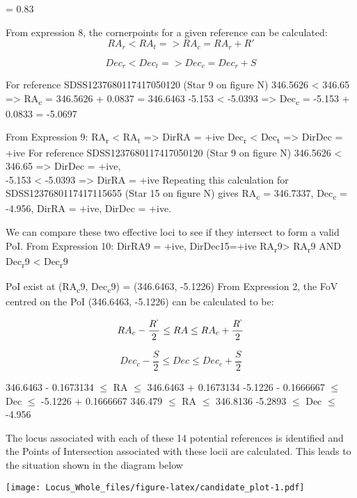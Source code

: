 \documentclass[]{elsarticle} %
\makeatletter
\def\maxwidth{\ifdim\Gin@nat@width>\linewidth\linewidth
\else\Gin@nat@width\fi}
\let\Oldincludegraphics\includegraphics
\renewcommand{\includegraphics}[1]{\Oldincludegraphics[width=\maxwidth]{#1}}
\makeatother
\begin{document}
= 0.83

\newpage

From expression 8, the cornerpoints for a given reference can be
calculated: \[RA_r < RA_t => RA_c = RA_r + R'\]

\[Dec_r < Dec_t => Dec_c = Dec_r + S\]

For reference SDSS1237680117417050120 (Star 9 on figure N) \vskip 0.2in
346.5626 \textless{} 346.65 =\textgreater{} RA\textsubscript{c} =
346.5626 + 0.0837 = 346.6463 \vskip 0.2in -5.153 \textless{} -5.0393
=\textgreater{} Dec\textsubscript{c} = -5.153 + 0.0833 = -5.0697

From Expression 9: RA\textsubscript{r} \textless{} RA\textsubscript{t}
=\textgreater{} DirRA = +ive Dec\textsubscript{r} \textless{}
Dec\textsubscript{t} =\textgreater{} DirDec = +ive \vskip 0.2in For
reference SDSS1237680117417050120 (Star 9 on figure N) \vskip 0.2in
346.5626 \textless{} 346.65 =\textgreater{} DirDec = +ive,\\
-5.153 \textless{} -5.0393 =\textgreater{} DirRA = +ive \vskip 0.2in
Repeating this calculation for SDSS1237680117417115655 (Star 15 on
figure N) gives RA\textsubscript{c} = 346.7337, Dec\textsubscript{c} =
-4.956, \vskip 0.2in DirRA = +ive, DirDec = +ive.

We can compare these two effective loci to see if they intersect to form
a valid PoI. \vskip 0.2in From Expression 10: DirRA9 = +ive,
DirDec15=+ive RA\textsubscript{r}9\textgreater{} RA\textsubscript{r}9
AND Dec\textsubscript{r}9 \textless{} Dec\textsubscript{r}9

PoI exist at (RA\textsubscript{c}9, Dec\textsubscript{c}9) = (346.6463,
-5.1226) \vskip 0.2in From Expression 2, the FoV centred on the PoI
(346.6463, -5.1226) can be calculated to be:

\[RA_c - {\frac{R^`}{2}} \leq RA \leq RA_c + {\frac{R^`}{2}} \]

\[Dec_c - {\frac{S}{2}} \leq Dec \leq Dec_c + {\frac{S}{2}}\]

346.6463 - 0.1673134 \(\leq\) RA \(\leq\) 346.6463 + 0.1673134
\vskip 0.2in -5.1226 - 0.1666667 \(\leq\) Dec \(\leq\) -5.1226 +
0.1666667 \vskip 0.2in 346.479 \(\leq\) RA \(\leq\) 346.8136
\vskip 0.2in -5.2893 \(\leq\) Dec \(\leq\) -4.956 \newpage

The locus associated with each of these 14 potential references is
identified and the Points of Intersection associated with these locii
are calculated. This leads to the situation shown in the diagram below

\texttt{[image: Locus\_Whole\_files/figure-latex/candidate\_plot-1.pdf]}
\end{document}
